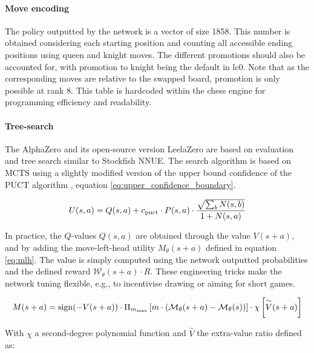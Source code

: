 \paragraph{Move encoding}

The policy outputted by the network is a vector of size 1858. This number is obtained considering each starting position and counting all accessible ending positions using queen and knight moves. The different promotions should also be accounted for, with promotion to knight being the default in lc0. Note that as the corresponding moves are relative to the swapped board, promotion is only possible at rank 8. This table is hardcoded within the chess engine for programming efficiency and readability.


\paragraph{Tree-search} The AlphaZero \cite{silver2018general} and its open-source version LeelaZero \cite{pascutto2019leela} are based on evaluation and tree search similar to Stockfish NNUE. The search algorithm is based on MCTS \cite{Coulom2006EfficientSA, kocsis2006bandit} using a slightly modified version of the upper bound confidence of the PUCT algorithm \cite{Rosin2011MultiarmedBW}, equation \ref{eq:upper_confidence_boundary}.


\begin{equation}
\label{eq:upper_confidence_boundary}
    U(s,a)=Q(s,a)+c_{\rm puct}\cdot P(s,a) \cdot \dfrac{\sqrt{\sum_b N(s,b)}}{1+N(s,a)}
\end{equation}

In practice, the $Q$-values $Q(s,a)$ are obtained through the value $V(s+a)$, and by adding the move-left-head utility $M_\theta(s+a)$ defined in equation \ref{eq:mlh}.
The value is simply computed using the network outputted probabilities and the defined reward $\mathcal{W}_\theta(s+a)\cdot R$. These engineering tricks make the network tuning flexible, e.g., to incentivise drawing or aiming for short games.

\begin{equation}
\label{eq:mlh}
    M(s+a)={\rm sign}(-V(s+a))
    \cdot\Pi_{m_{\rm max}}\left[m
    \cdot\left(\mathcal{M}_\theta(s+a)-\mathcal{M}_\theta(s)\right)
    \right]
    \cdot \chi \left[\overset{\sim}{V}(s+a)\right]
\end{equation}

With $\chi$ a second-degree polynomial function and $\overset{\sim}{V}$ the extra-value ratio defined as:

